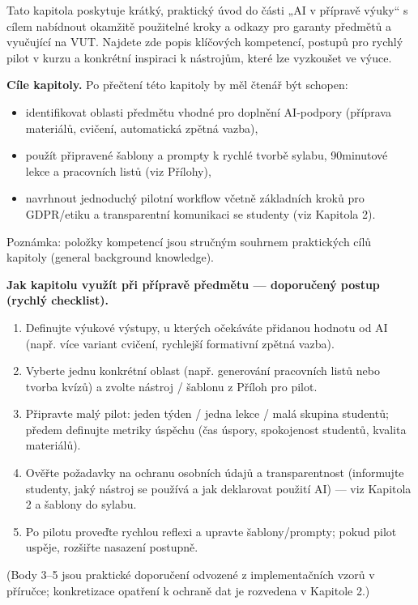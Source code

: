 \documentclass{report}%
\begin{document}
%
Tato kapitola poskytuje krátký, praktický úvod do části „AI v přípravě výuky“ s cílem nabídnout okamžitě použitelné kroky a odkazy pro garanty předmětů a vyučující na VUT. Najdete zde popis klíčových kompetencí, postupů pro rychlý pilot v kurzu a konkrétní inspiraci k nástrojům, které lze vyzkoušet ve výuce.

\medskip

\textbf{Cíle kapitoly.} Po přečtení této kapitoly by měl čtenář být schopen:
\begin{itemize}
  \item identifikovat oblasti předmětu vhodné pro doplnění AI‑podpory (příprava materiálů, cvičení, automatická zpětná vazba),
  \item použít připravené šablony a prompty k rychlé tvorbě sylabu, 90minutové lekce a pracovních listů (viz Přílohy),
  \item navrhnout jednoduchý pilotní workflow včetně základních kroků pro GDPR/etiku a transparentní komunikaci se studenty (viz Kapitola 2).
\end{itemize}
Poznámka: položky kompetencí jsou stručným souhrnem praktických cílů kapitoly (general background knowledge).

\medskip

\textbf{Jak kapitolu využít při přípravě předmětu — doporučený postup (rychlý checklist).}
\begin{enumerate}
  \item Definujte výukové výstupy, u kterých očekáváte přidanou hodnotu od AI (např. více variant cvičení, rychlejší formativní zpětná vazba).
  \item Vyberte jednu konkrétní oblast (např. generování pracovních listů nebo tvorba kvízů) a zvolte nástroj / šablonu z Příloh pro pilot.
  \item Připravte malý pilot: jeden týden / jedna lekce / malá skupina studentů; předem definujte metriky úspěchu (čas úspory, spokojenost studentů, kvalita materiálů).
  \item Ověřte požadavky na ochranu osobních údajů a transparentnost (informujte studenty, jaký nástroj se používá a jak deklarovat použití AI) — viz Kapitola 2 a šablony do sylabu.
  \item Po pilotu proveďte rychlou reflexi a upravte šablony/prompty; pokud pilot uspěje, rozšiřte nasazení postupně.
\end{enumerate}
(Body 3–5 jsou praktické doporučení odvozené z implementačních vzorů v příručce; konkretizace opatření k ochraně dat je rozvedena v Kapitole 2.)
\end{document}
